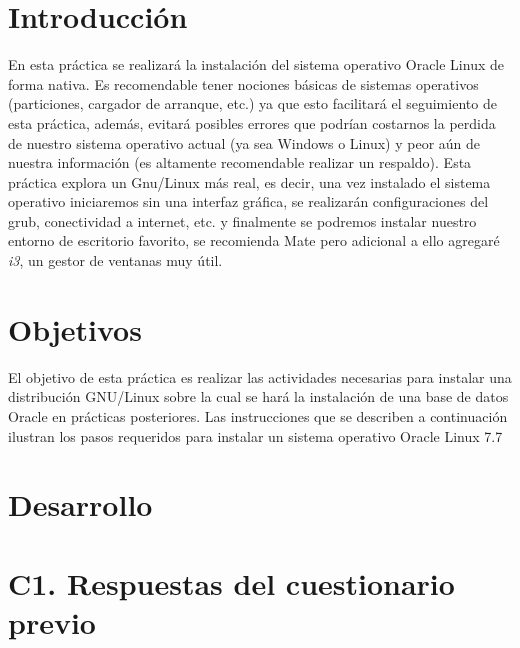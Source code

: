 \documentclass{article}
\begin{document}
\section*{Introducción}
En esta práctica se realizará la instalación del sistema operativo Oracle
Linux de forma nativa. Es recomendable tener nociones básicas de sistemas
operativos (particiones, cargador de arranque, etc.) ya que esto facilitará el 
seguimiento de esta práctica, además, evitará posibles errores que podrían 
costarnos la perdida de nuestro sistema operativo actual (ya sea Windows o 
Linux) y peor aún de nuestra información (es altamente recomendable realizar un
respaldo). Esta práctica explora un Gnu/Linux más real, es decir, una vez 
instalado el sistema operativo iniciaremos sin una interfaz gráfica, se
realizarán configuraciones del grub, conectividad a internet, etc. y finalmente
se podremos instalar nuestro entorno de escritorio favorito, se recomienda Mate
pero adicional a ello agregaré \textit{i3}, un gestor de ventanas muy útil.

\section*{Objetivos}
El objetivo de esta práctica es realizar las actividades necesarias para 
instalar una distribución GNU/Linux sobre la cual se hará la instalación de una
base de datos Oracle en prácticas posteriores. Las instrucciones que se 
describen a continuación ilustran los pasos requeridos para instalar un sistema
operativo Oracle Linux 7.7
\section*{Desarrollo}
\section*{C1. Respuestas del cuestionario previo}
\end{document}

